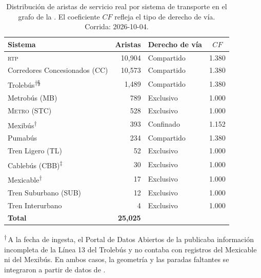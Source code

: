\begin{table}[H]
    \centering
    \caption[Distribución de aristas de servicio por sistema de transporte]{
    Distribución de aristas de servicio real por sistema de transporte en el
    grafo de la \zmvm{}. El coeficiente $CF$ refleja el tipo de derecho de vía.
    Corrida: 2026-10-04.}
    \label{tab:aristas-por-sistema}
    \begin{tabular}{|l|r|l|c|}
        \hline
        \textbf{Sistema} & \textbf{Aristas} & \textbf{Derecho de vía} &
        \textbf{$CF$} \\
        \hline
        \textsc{rtp}                  & 10{,}904 & Compartido  & 1.380 \\
        Corredores Concesionados (CC) & 10{,}573 & Compartido  & 1.380 \\
        Trolebús\textsuperscript{†§}  &  1{,}489 & Compartido  & 1.380 \\
        Metrobús (MB)                 &    789   & Exclusivo   & 1.000 \\
        \textsc{Metro} (STC)          &    528   & Exclusivo   & 1.000 \\
        Mexibús\textsuperscript{†}    &    393   & Confinado   & 1.152 \\
        Pumabús                       &    234   & Compartido  & 1.380 \\
        Tren Ligero (TL)              &     52   & Exclusivo   & 1.000 \\
        Cablebús (CBB)\textsuperscript{‡} &  30  & Exclusivo   & 1.000 \\
        Mexicable\textsuperscript{†}  &     17   & Exclusivo   & 1.000 \\
        Tren Suburbano (SUB)          &     12   & Exclusivo   & 1.000 \\
        Tren Interurbano              &      4   & Exclusivo   & 1.000 \\
        \hline
        \textbf{Total}                & \textbf{25{,}025} & & \\
        \hline
    \end{tabular}
    \vspace{0.5em}

    \noindent\textsuperscript{†}\,A la fecha de ingesta, el Portal de Datos
    Abiertos de la \cdmx{} publicaba información incompleta de la Línea 13 del
    Trolebús y no contaba con registros del Mexicable ni del Mexibús. En ambos
    casos, la geometría y las paradas faltantes se integraron a partir de
    datos de  \citep{osm2012}.


\end{table}
